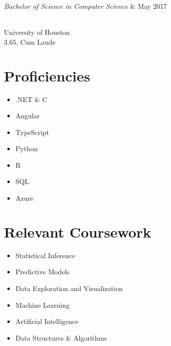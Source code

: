 \documentclass{res}
\begin{document}
{\begin{resume}
\begin{ncolumn}{2}
  {\it Bachelor of Science in Computer Science}  &   {\hspace*{\fill} May 2017}
\end{ncolumn}\\
University of Houston\\
3.65, Cum Laude

\begin{multicols}{2}
  \section{\bf Proficiencies}
  \begin{itemize}[noitemsep]
    \item .NET \& C\musSharp{}
    \item Angular
    \item TypeScript
    \item Python
    \item R
    \item SQL
    \item Azure
  \end{itemize}
  
  \section{\bf Relevant Coursework}
  \begin{itemize}[noitemsep]
    \item Statistical Inference
    \item Predictive Models
    \item Data Exploration and Visualization
    \item Machine Learning
    \item Artificial Intelligence
    \item Data Structures \& Algorithms
  \end{itemize}
\end{multicols}

\end{resume}

\vfill}
\end{document}
